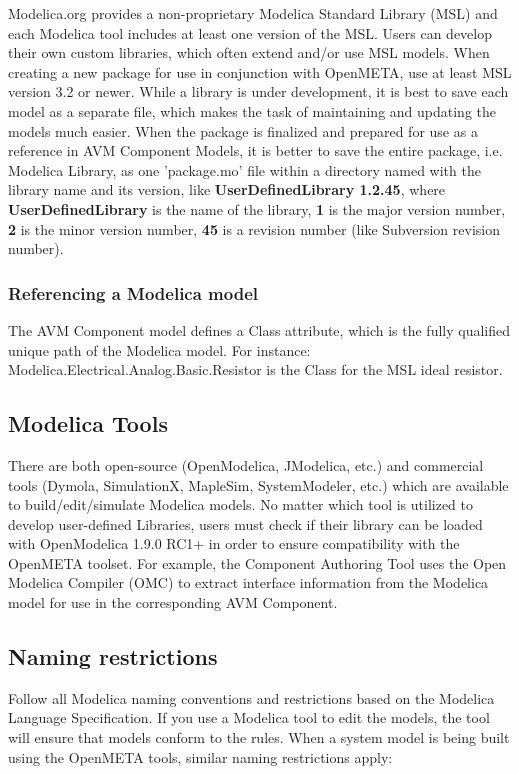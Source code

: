 Modelica.org provides a non-proprietary Modelica Standard Library (MSL) and each Modelica tool includes at least one version of the MSL.
Users can develop their own custom libraries, which often extend and/or use MSL models. When creating a new package for use in conjunction 
with OpenMETA, use at least MSL version 3.2 or newer.  While a library is under development, it is best to save each model as a separate 
file, which makes the task of maintaining and updating the models much easier. When the package is finalized and prepared for use as a 
reference in AVM Component Models, it is better to save the entire package, i.e. Modelica Library, as one 'package.mo' file within a directory named with the library name and its version, like \textbf{UserDefinedLibrary 1.2.45}, where \textbf{UserDefinedLibrary} is the name of the 
library, \textbf{1} is the major version number, \textbf{2} is the minor version number, \textbf{45} is a revision number (like Subversion 
revision number).

\subsubsection{Referencing a Modelica model}
The AVM Component model defines a Class attribute, which is the fully qualified unique path of the Modelica model. For instance: Modelica.Electrical.Analog.Basic.Resistor is the Class for the MSL ideal resistor.


\subsection{Modelica Tools}
There are both open-source (OpenModelica, JModelica, etc.) and commercial tools (Dymola, SimulationX, MapleSim, SystemModeler, etc.) 
which are available to build/edit/simulate Modelica models. No matter which tool is utilized to develop user-defined Libraries, 
users must check if their library can be loaded with OpenModelica 1.9.0 RC1+ in order to ensure compatibility with the OpenMETA toolset.
For example, the Component Authoring Tool uses the Open Modelica Compiler (OMC) to extract interface information from the Modelica model 
for use in the corresponding AVM Component.

\subsection{Naming restrictions}
Follow all Modelica naming conventions and restrictions based on the Modelica Language Specification. If you use a Modelica tool to edit the 
models, the tool will ensure that models conform to the rules. When a system model is being built using the OpenMETA tools, similar naming restrictions apply:


